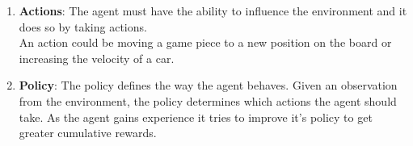 \begin{enumerate}[itemsep=5pt]
    \item \textbf{Actions}: The agent must have the ability to influence the environment and it does so by taking actions.\\ An action could be moving a game piece to a new position on the board or increasing the velocity of a car.

    \item \textbf{Policy}: The policy defines the way the agent behaves. Given an observation from the environment, the policy determines which actions the agent should take. As the agent gains experience it tries to improve it’s policy to get greater cumulative rewards.
\end{enumerate}



































